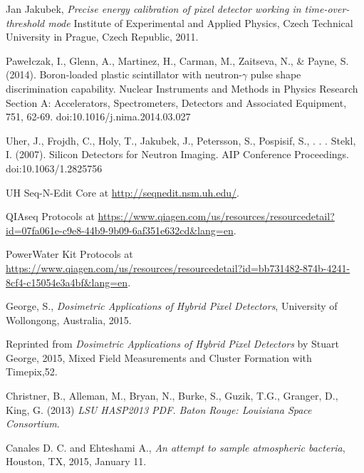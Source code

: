 \begin{thebibliography}{9}
  Jan Jakubek, \textit{Precise energy calibration of pixel detector working in time-over-threshold mode} Institute of Experimental and Applied Physics, Czech Technical University in Prague, Czech Republic, 2011.

  Pawełczak, I., Glenn, A., Martinez, H., Carman, M., Zaitseva, N., \& Payne, S. (2014). Boron-loaded plastic scintillator with neutron-$\gamma$ pulse shape discrimination capability. Nuclear Instruments and Methods in Physics Research Section A: Accelerators, Spectrometers, Detectors and Associated Equipment, 751, 62-69. doi:10.1016/j.nima.2014.03.027

  Uher, J., Frojdh, C., Holy, T., Jakubek, J., Petersson, S., Pospisif, S., . . . Stekl, I. (2007). Silicon Detectors for Neutron Imaging. AIP Conference Proceedings. doi:10.1063/1.2825756
  
  UH Seq-N-Edit Core at \url{http://seqnedit.nsm.uh.edu/}.
  
  QIAseq Protocols at \url{https://www.qiagen.com/us/resources/resourcedetail?id=07fa061e-c9e8-44b9-9b09-6af351e632cd&lang=en}.  

  PowerWater Kit Protocols at \url{https://www.qiagen.com/us/resources/resourcedetail?id=bb731482-874b-4241-8cf4-c15054e3a4bf&lang=en}.  
  
  George, S., \textit{Dosimetric Applications of Hybrid Pixel Detectors}, University of Wollongong, Australia, 2015.

  Reprinted from \textit{Dosimetric Applications of Hybrid Pixel Detectors} by Stuart George, 2015, Mixed Field Measurements and Cluster Formation with Timepix,52.

  Christner, B., Alleman, M., Bryan, N., Burke, S., Guzik, T.G., Granger, D., King, G. (2013) \textit{LSU HASP2013 PDF. Baton Rouge: Louisiana Space Consortium}.

  

 Canales D. C. and Ehteshami A., \textit{An attempt to sample atmospheric bacteria}, Houston, TX, 2015, January 11.

	

\end{thebibliography}
